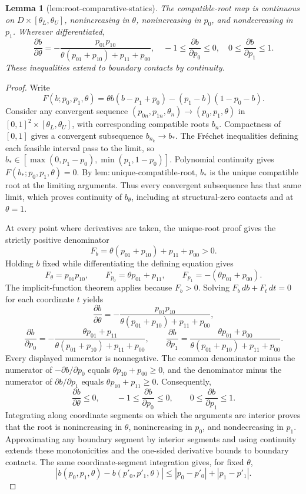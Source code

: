 \documentclass{article}
\newtheorem{lemma}{Lemma}
\begin{document}
\begin{lemma}[lem:root-comparative-statics]\label{lem:root-comparative-statics}
The compatible-root map is continuous on \(D\times[\theta_L,\theta_U]\), nonincreasing in \(\theta\), nonincreasing in \(p_0\), and nondecreasing in \(p_1\). Wherever differentiated, \[\frac{\partial b}{\partial\theta}=-\frac{p_{01}p_{10}}{\theta(p_{01}+p_{10})+p_{11}+p_{00}},\quad -1\le\frac{\partial b}{\partial p_0}\le0,\quad 0\le\frac{\partial b}{\partial p_1}\le1.\] These inequalities extend to boundary contacts by continuity.
\end{lemma}
\begin{proof}
Write
\[
F(b;p_0,p_1,\theta)
=\theta b(b-p_1+p_0)-(p_1-b)(1-p_0-b).
\]
Consider any convergent sequence \((p_{0n},p_{1n},\theta_n)\to(p_0,p_1,\theta)\) in \([0,1]^2\times[\theta_L,\theta_U]\), with corresponding compatible roots \(b_n\). Compactness of \([0,1]\) gives a convergent subsequence \(b_{n_k}\to b_*\). The Fr\'echet inequalities defining each feasible interval pass to the limit, so \(b_*\in[\max(0,p_1-p_0),\min(p_1,1-p_0)]\). Polynomial continuity gives \(F(b_*;p_0,p_1,\theta)=0\). By \(\mathrm{lem:unique\text{-}compatible\text{-}root}\), \(b_*\) is the unique compatible root at the limiting arguments. Thus every convergent subsequence has that same limit, which proves continuity of \(b_\theta\), including at structural-zero contacts and at \(\theta=1\).

At every point where derivatives are taken, the unique-root proof gives the strictly positive denominator
\[
F_b=\theta(p_{01}+p_{10})+p_{11}+p_{00}>0.
\]
Holding \(b\) fixed while differentiating the defining equation gives
\[
F_\theta=p_{01}p_{10},\qquad
F_{p_0}=\theta p_{01}+p_{11},\qquad
F_{p_1}=-(\theta p_{01}+p_{00}).
\]
The implicit-function theorem applies because \(F_b>0\). Solving \(F_b\,db+F_t\,dt=0\) for each coordinate \(t\) yields
\[
\frac{\partial b}{\partial\theta}
=-\frac{p_{01}p_{10}}
{\theta(p_{01}+p_{10})+p_{11}+p_{00}},
\]
\[
\frac{\partial b}{\partial p_0}
=-\frac{\theta p_{01}+p_{11}}
{\theta(p_{01}+p_{10})+p_{11}+p_{00}},
\qquad
\frac{\partial b}{\partial p_1}
=\frac{\theta p_{01}+p_{00}}
{\theta(p_{01}+p_{10})+p_{11}+p_{00}}.
\]
Every displayed numerator is nonnegative. The common denominator minus the numerator of \(-\partial b/\partial p_0\) equals \(\theta p_{10}+p_{00}\geq0\), and the denominator minus the numerator of \(\partial b/\partial p_1\) equals \(\theta p_{10}+p_{11}\geq0\). Consequently,
\[
\frac{\partial b}{\partial\theta}\leq0,
\qquad
-1\leq\frac{\partial b}{\partial p_0}\leq0,
\qquad
0\leq\frac{\partial b}{\partial p_1}\leq1.
\]
Integrating along coordinate segments on which the arguments are interior proves that the root is nonincreasing in \(\theta\), nonincreasing in \(p_0\), and nondecreasing in \(p_1\). Approximating any boundary segment by interior segments and using continuity extends these monotonicities and the one-sided derivative bounds to boundary contacts. The same coordinate-segment integration gives, for fixed \(\theta\),
\[
|b(p_0,p_1,\theta)-b(p'_0,p'_1,\theta)|
\leq |p_0-p'_0|+|p_1-p'_1|.
\]
\end{proof}
\end{document}
